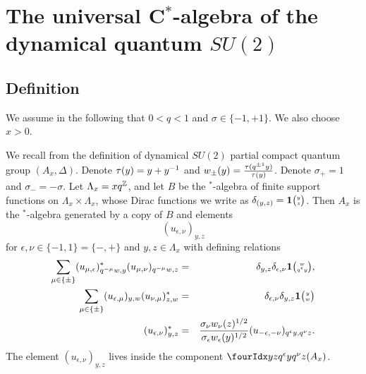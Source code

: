 


\section{The universal C$^*$-algebra of the dynamical quantum $SU(2)$}\label{SecUni}

\subsection{Definition}

We assume in the following that $0<q<1$ and $\sigma \in \{-1,+1\}$. We also choose $x>0$.

We recall from \cite{DCT1} the definition of dynamical $SU(2)$ partial compact quantum group $(A_x,\Delta)$. Denote $\operatorname{\tau}(y) = y+y^{-1}$ and $w_{\pm}(y) = \frac{\operatorname{\tau}(q^{\pm 1}y)}{\operatorname{\tau}(y)}$. Denote $\sigma_+ = 1$ and $\sigma_- = -\sigma$. Let $\Lambda_x = xq^{\mathbb{Z}}$, and let $B$ be the $^*$-algebra of finite support functions on $\Lambda_x\times \Lambda_x$, whose Dirac functions we write as $\delta_{(y,z)}=\mathbf{1}{\tiny {\begin{pmatrix} y\\z\end{pmatrix}}}$. Then $A_x$ is the $^*$-algebra generated by a copy of $B$ and elements \[(u_{\epsilon,\nu})_{y,z}\] for $\epsilon,\nu\in \{-1,1\}=\{-,+\}$ and $y,z\in \Lambda_x$ with defining relations \begin{eqnarray*} \sum_{\mu\in \{\pm\}} (u_{\mu,\epsilon})_{q^{-\mu}w,y}^* (u_{\mu,\nu})_{q^{-\mu}w,z}&=& \delta_{y,z} \delta_{\epsilon,\nu} \mathbf{1}{\tiny {\begin{pmatrix} w\\q^{\epsilon}y\end{pmatrix}}},\\ \sum_{\mu\in \{\pm\}} (u_{\epsilon,\mu})_{y,w} (u_{\nu,\mu})_{z,w}^* &=& \delta_{\epsilon,\nu}\delta_{y,z} \mathbf{1}{\tiny {\begin{pmatrix} y\\w\end{pmatrix}}} \\ (u_{\epsilon,\nu})_{y,z}^* &=& \frac{\sigma_{\nu}w_{\nu}(z)^{1/2}}{\sigma_{\epsilon}w_{\epsilon}(y)^{1/2}} (u_{-\epsilon,-\nu})_{q^{\epsilon}y,q^{\nu}z}.\end{eqnarray*} The element $(u_{\epsilon,\nu})_{y,z}$ lives inside the component $\Gr{(A_x)}{y}{q^{\epsilon}y}{z}{q^{\nu}z}$.

